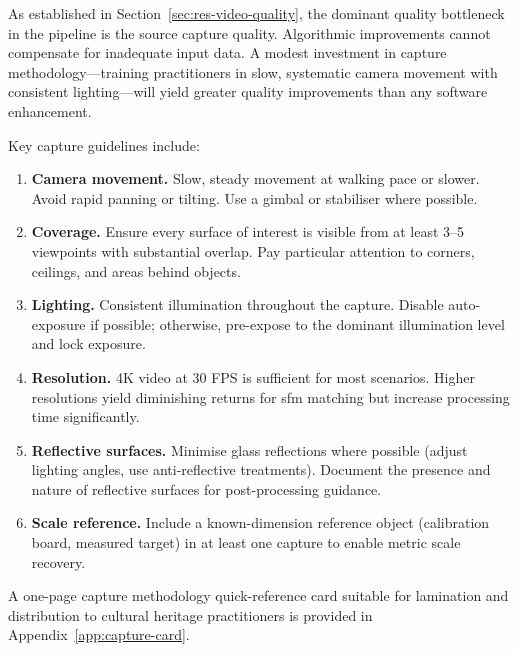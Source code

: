As established in Section~\ref{sec:res-video-quality}, the dominant quality bottleneck in the pipeline is the source capture quality. Algorithmic improvements cannot compensate for inadequate input data. A modest investment in capture methodology---training practitioners in slow, systematic camera movement with consistent lighting---will yield greater quality improvements than any software enhancement.

Key capture guidelines include:

\begin{enumerate}
  \item \textbf{Camera movement.} Slow, steady movement at walking pace or slower. Avoid rapid panning or tilting. Use a gimbal or stabiliser where possible.

  \item \textbf{Coverage.} Ensure every surface of interest is visible from at least 3--5 viewpoints with substantial overlap. Pay particular attention to corners, ceilings, and areas behind objects.

  \item \textbf{Lighting.} Consistent illumination throughout the capture. Disable auto-exposure if possible; otherwise, pre-expose to the dominant illumination level and lock exposure.

  \item \textbf{Resolution.} 4K video at 30 FPS is sufficient for most scenarios. Higher resolutions yield diminishing returns for \acrshort{sfm} matching but increase processing time significantly.

  \item \textbf{Reflective surfaces.} Minimise glass reflections where possible (adjust lighting angles, use anti-reflective treatments). Document the presence and nature of reflective surfaces for post-processing guidance.

  \item \textbf{Scale reference.} Include a known-dimension reference object (calibration board, measured target) in at least one capture to enable metric scale recovery.
\end{enumerate}

\begin{technote}
A one-page capture methodology quick-reference card suitable for lamination and distribution to cultural heritage practitioners is provided in Appendix~\ref{app:capture-card}.
\end{technote}

